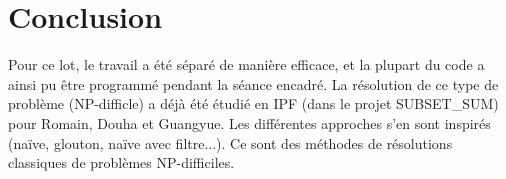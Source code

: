 \documentclass[10pt]{article}
\begin{document}
  \section{Conclusion}
    Pour ce lot, le travail a été séparé de manière efficace, et la plupart du code a ainsi pu être programmé pendant la séance encadré.
    La résolution de ce type de problème (NP-difficle) a déjà été étudié en IPF (dans le projet SUBSET\_SUM) pour Romain, Douha et Guangyue.
    Les différentes approches s'en sont inspirés (naïve, glouton, naïve avec filtre...).
    Ce sont des méthodes de résolutions classiques de problèmes NP-difficiles.
\end{document}
